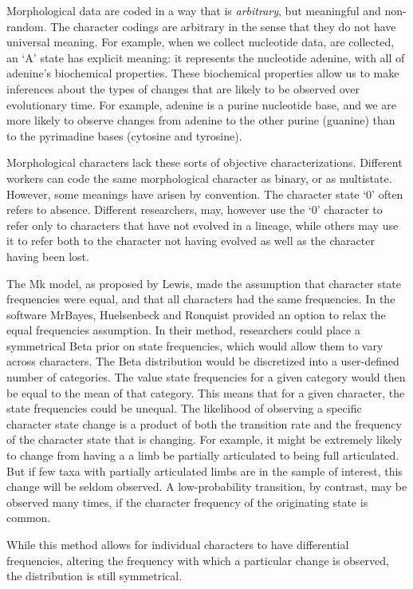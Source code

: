 \documentclass[]{article}
\begin{document}
	Morphological data are coded in a way that is \textit{arbitrary}, but meaningful and non-random.
	The character codings are arbitrary in the sense that they do not have universal meaning.
	For example, when we collect nucleotide data, are collected, an `A' state has explicit meaning: it represents the nucleotide adenine, with all of adenine's biochemical properties.
	These biochemical properties allow us to make inferences about the types of changes that are likely to be observed over evolutionary time.
	For example, adenine is a purine nucleotide base, and we are more likely to observe changes from adenine to the other purine (guanine) than to the pyrimadine bases (cytosine and tyrosine). \par
	Morphological characters lack these sorts of objective characterizations.
	Different workers can code the same morphological character as binary, or as multistate. 
	However, some meanings have arisen by convention.
	The character state `0' often refers to absence.
	Different researchers, may, however use the `0' character to refer only to characters that have not evolved in a lineage, while others may use it to refer both to the character not having evolved as well as the character having been lost. \par
	The Mk model, as proposed by Lewis, made the assumption that character state frequencies were equal, and that all characters had the same frequencies.
	In the software MrBayes, Huelsenbeck and Ronquist provided an option to relax the equal frequencies assumption.
	In their method, researchers could place a symmetrical Beta prior on state frequencies, which would allow them to vary across characters. 
	The Beta distribution would be discretized into a user-defined number of categories.
	The value state frequencies for a given category would then be equal to the mean of that category. 
	This means that for a given character, the state frequencies could be unequal.
	The likelihood of observing a specific character state change is a product of both the transition rate and the frequency of the character state that is changing.
	For example, it might be extremely likely to change from having a a limb be partially articulated to being full articulated.
	But if few taxa with partially articulated limbs are in the sample of interest, this change will be seldom observed. 
	A low-probability transition, by contrast, may be observed many times, if the character frequency of the originating state is common. \par
	While this method allows for individual characters to have differential frequencies, altering the frequency with which a particular change is observed, the distribution is still symmetrical.
\end{document}
